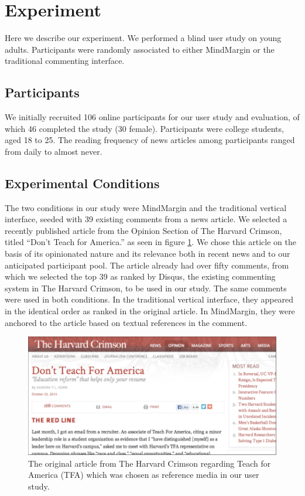 \section{Experiment}

Here we describe our experiment. We performed a blind user study on young adults. Participants were randomly associated to either MindMargin or the traditional commenting interface.

\subsection{Participants}
We initially recruited 106 online participants for our user study and evaluation, of which 46 completed the study (30 female). Participants were college students, aged 18 to 25. The reading frequency of news articles among participants ranged from daily to almost never. 

\subsection{Experimental Conditions}
The two conditions in our study were MindMargin and the traditional vertical interface, seeded with 39 existing comments from a news article. We selected a recently published article from the Opinion Section of The Harvard Crimson, titled “Don’t Teach for America.” as seen in figure \ref{fig:crimson}. We chose this article on the basis of its opinionated nature and its relevance both in recent news and to our anticipated participant pool. The article already had over fifty comments, from which we selected the top 39 as ranked by Disqus, the existing commenting system in The Harvard Crimson, to be used in our study. The same comments were used in both conditions. In the traditional vertical interface, they appeared in the identical order as ranked in the original article. In MindMargin, they were anchored to the article based on textual references in the comment.

\begin{figure}
\centering
\includegraphics[scale=0.25]{crimson.png}
\caption{The original article from The Harvard Crimson regarding Teach for America (TFA) which was chosen as reference media in our user study.}
\label{fig:crimson}
\end{figure}

